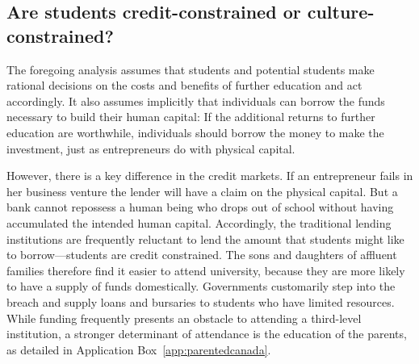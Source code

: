 \newhtmlpage

\subsection*{Are students credit-constrained or culture-constrained?}

The foregoing analysis assumes that students and potential students make
rational decisions on the costs and benefits of further education and act
accordingly. It also assumes implicitly that individuals can borrow the
funds necessary to build their human capital: If the additional returns to
further education are worthwhile, individuals should borrow the money to
make the investment, just as entrepreneurs do with physical capital.

However, there is a key difference in the credit markets. If an entrepreneur
fails in her business venture the lender will have a claim on the physical
capital. But a bank cannot repossess a human being who drops out of school
without having accumulated the intended human capital. Accordingly, the
traditional lending institutions are frequently reluctant to lend the amount
that students might like to borrow---students are credit constrained. The
sons and daughters of affluent families therefore find it easier to attend
university, because they are more likely to have a supply of funds
domestically. Governments customarily step into the breach and supply loans
and bursaries to students who have limited resources. While funding
frequently presents an obstacle to attending a third-level institution, a
stronger determinant of attendance is the education of the parents, as
detailed in Application Box~\ref{app:parentedcanada}.

\newhtmlpage

\newpage

